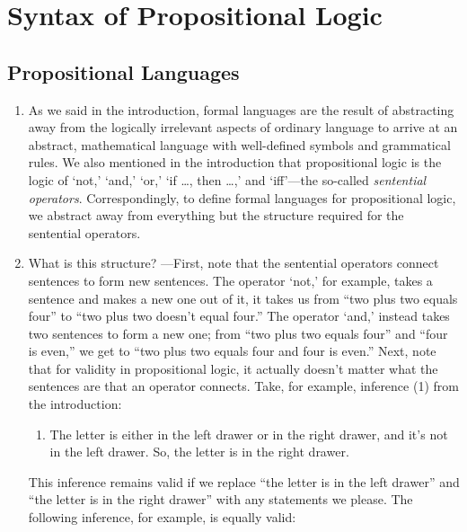 \chapter{Syntax of Propositional Logic}

\section{Propositional Languages}

	\begin{enumerate}[\thesection.1]
	
		\item As we said in the introduction, formal languages are the result of abstracting away from the logically irrelevant aspects of ordinary language to arrive at an abstract, mathematical language with well-defined symbols and grammatical rules.  We also mentioned in the introduction that propositional logic is the logic of `not,' `and,' `or,' `if \dots, then \dots,' and `iff'---the so-called \emph{sentential operators}. Correspondingly, to define formal languages for propositional logic, we abstract away from everything but the structure required for the sentential operators. 
		
		\item What is this structure? ---First, note that the sentential operators connect sentences to form new sentences. The operator `not,' for example, takes a sentence and makes a new one out of it, it takes us from ``two plus two equals four'' to ``two plus two doesn't equal four.'' The operator `and,' instead takes two sentences to form a new one; from ``two plus two equals four'' and ``four is even,'' we get to ``two plus two equals four and four is even.'' Next, note that for validity in propositional logic, it actually doesn't matter what the sentences are that an operator connects. Take, for example, inference (1) from the introduction:
		\begin{enumerate}[(1)]
		
			\item The letter is either in the left drawer or in the right drawer, and it's not in the left drawer. So, the letter is in the right drawer.
		
		\end{enumerate}
This inference remains valid if we replace 	``the letter is in the left drawer'' and ``the letter is in the right drawer'' with any statements we please. The following inference, for example, is equally valid:	
		\begin{enumerate}[(1')]
		

\end{enumerate}
\end{enumerate}
